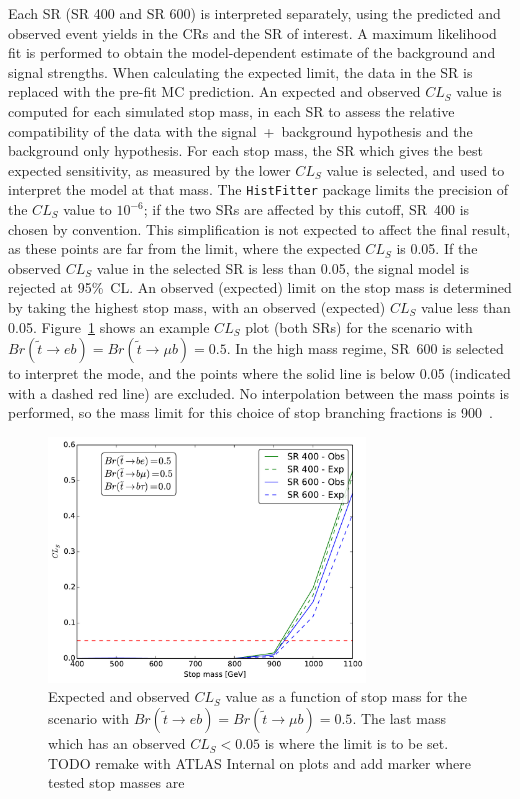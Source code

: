 Each SR (SR 400 and SR 600) is interpreted separately, using the predicted and
observed event yields in the CRs and the SR of interest.
A maximum likelihood fit is performed to obtain the model-dependent estimate of
the background and signal strengths.
When calculating the expected limit, the data in the SR is replaced with the
pre-fit MC prediction.
An expected and observed $CL_S$ value is computed for each simulated stop mass,
in each SR to assess the relative compatibility of the data with the
signal~+~background hypothesis and the background only hypothesis.
For each stop mass, the SR which gives the best expected sensitivity, as
measured by the lower $CL_S$ value is selected, and used to interpret the model
at that mass.
The \texttt{HistFitter} package limits the precision of the $CL_S$ value
to $10^{-6}$; if the two SRs are affected by this cutoff, SR~400 is chosen by
convention.
This simplification is not expected to affect the final result, as these points
are far from the limit, where the expected $CL_S$ is 0.05.
If the observed $CL_S$ value in the selected SR is less than 0.05, the signal
model is rejected at 95\%~CL.
An observed (expected) limit on the stop mass is determined by taking the
highest stop mass, with an observed (expected) $CL_S$ value less than 0.05.
Figure~\ref{fig:exp_limit_br_5050} shows an example $CL_S$ plot (both SRs)
for the scenario with $Br(\tilde{t} \to eb) = Br(\tilde{t} \to \mu b) = 0.5$.
In the high mass regime, SR~600 is selected to interpret the mode, and
the points where the solid line is below 0.05 (indicated with a dashed red line)
are excluded.
No interpolation between the mass points is performed, so the mass limit for
this choice of stop branching fractions is 900~\GeV.

\begin{figure}[t]
  \centering
  \includegraphics[width=0.75\textwidth]{figs/blstop/cls_plots/cls_vs_m_br_e_50_br_m_50_br_t_0.pdf}
  \caption{
    Expected and observed $CL_S$ value as a function of stop mass for
    the scenario with $Br(\tilde{t} \to eb) = Br(\tilde{t} \to \mu b) = 0.5$.
    The last mass which has an observed $CL_S < 0.05$ is where the limit is to
    be set.
    {\color{red} TODO remake with ATLAS Internal on plots and add marker where
    tested stop masses are}
  }
  \label{fig:exp_limit_br_5050}
\end{figure}

